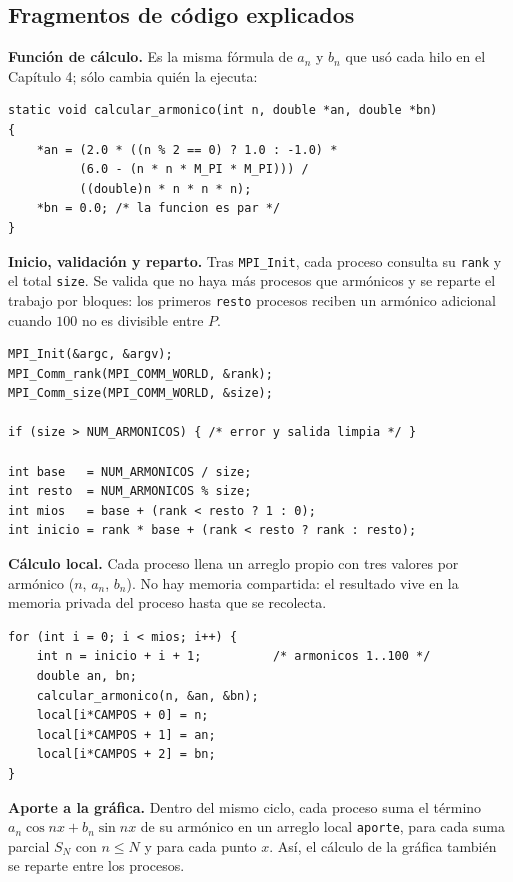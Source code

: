 \subsection{Fragmentos de código explicados}

\textbf{Función de cálculo.} Es la misma fórmula de $a_n$ y $b_n$ que usó cada hilo en el Capítulo 4; sólo cambia quién la ejecuta:

\begin{lstlisting}[style=C]
static void calcular_armonico(int n, double *an, double *bn)
{
    *an = (2.0 * ((n % 2 == 0) ? 1.0 : -1.0) *
          (6.0 - (n * n * M_PI * M_PI))) /
          ((double)n * n * n * n);
    *bn = 0.0; /* la funcion es par */
}
\end{lstlisting}

\textbf{Inicio, validación y reparto.} Tras \texttt{MPI\_Init}, cada proceso consulta su \texttt{rank} y el total \texttt{size}. Se valida que no haya más procesos que armónicos y se reparte el trabajo por bloques: los primeros \texttt{resto} procesos reciben un armónico adicional cuando $100$ no es divisible entre $P$.

\begin{lstlisting}[style=C]
MPI_Init(&argc, &argv);
MPI_Comm_rank(MPI_COMM_WORLD, &rank);
MPI_Comm_size(MPI_COMM_WORLD, &size);

if (size > NUM_ARMONICOS) { /* error y salida limpia */ }

int base   = NUM_ARMONICOS / size;
int resto  = NUM_ARMONICOS % size;
int mios   = base + (rank < resto ? 1 : 0);
int inicio = rank * base + (rank < resto ? rank : resto);
\end{lstlisting}

\textbf{Cálculo local.} Cada proceso llena un arreglo propio con tres valores por armónico ($n$, $a_n$, $b_n$). No hay memoria compartida: el resultado vive en la memoria privada del proceso hasta que se recolecta.

\begin{lstlisting}[style=C]
for (int i = 0; i < mios; i++) {
    int n = inicio + i + 1;          /* armonicos 1..100 */
    double an, bn;
    calcular_armonico(n, &an, &bn);
    local[i*CAMPOS + 0] = n;
    local[i*CAMPOS + 1] = an;
    local[i*CAMPOS + 2] = bn;
}
\end{lstlisting}

\textbf{Aporte a la gráfica.} Dentro del mismo ciclo, cada proceso suma el término $a_n\cos nx + b_n\sin nx$ de su armónico en un arreglo local \texttt{aporte}, para cada suma parcial $S_N$ con $n\le N$ y para cada punto $x$. Así, el cálculo de la gráfica también se reparte entre los procesos.

